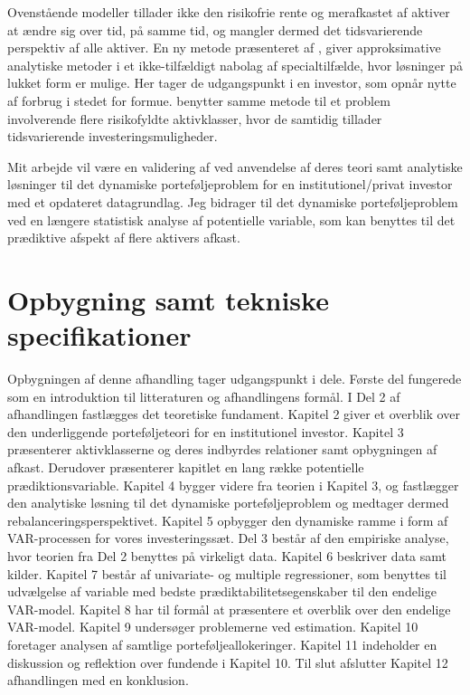 \documentclass[
  a4paper,
  oneside]{memoir}
\begin{document}
Ovenstående modeller tillader ikke den risikofrie rente og merafkastet af aktiver at ændre sig over tid, på samme tid, og mangler dermed det tidsvarierende perspektiv af alle aktiver. En ny metode præsenteret af \citep{CampVic1999, CampVic2001, CampVic2003}, giver approksimative analytiske metoder i et ikke-tilfældigt nabolag af specialtilfælde, hvor løsninger på lukket form er mulige. Her tager de udgangspunkt i en investor, som opnår nytte af forbrug i stedet for formue. \citep{CampVicCha2003} benytter samme metode til et problem involverende flere risikofyldte aktivklasser, hvor de samtidig tillader tidsvarierende investeringsmuligheder.

Mit arbejde vil være en validering af \citep{JurVic2011} ved anvendelse af deres teori samt analytiske løsninger til det dynamiske porteføljeproblem for en institutionel/privat investor med et opdateret datagrundlag. Jeg bidrager til det dynamiske porteføljeproblem ved en længere statistisk analyse af potentielle variable, som kan benyttes til det prædiktive afspekt af flere aktivers afkast.

\hypertarget{opbygning-samt-tekniske-specifikationer}{%
\section{Opbygning samt tekniske specifikationer}\label{opbygning-samt-tekniske-specifikationer}}

Opbygningen af denne afhandling tager udgangspunkt i dele. Første del fungerede som en introduktion til litteraturen og afhandlingens formål. I Del 2 af afhandlingen fastlægges det teoretiske fundament. Kapitel 2 giver et overblik over den underliggende porteføljeteori for en institutionel investor. Kapitel 3 præsenterer aktivklasserne og deres indbyrdes relationer samt opbygningen af afkast. Derudover præsenterer kapitlet en lang række potentielle prædiktionsvariable. Kapitel 4 bygger videre fra teorien i Kapitel 3, og fastlægger den analytiske løsning til det dynamiske porteføljeproblem og medtager dermed rebalanceringsperspektivet. Kapitel 5 opbygger den dynamiske ramme i form af VAR-processen for vores investeringssæt. Del 3 består af den empiriske analyse, hvor teorien fra Del 2 benyttes på virkeligt data. Kapitel 6 beskriver data samt kilder. Kapitel 7 består af univariate- og multiple regressioner, som benyttes til udvælgelse af variable med bedste prædiktabilitetsegenskaber til den endelige VAR-model. Kapitel 8 har til formål at præsentere et overblik over den endelige VAR-model. Kapitel 9 undersøger problemerne ved estimation. Kapitel 10 foretager analysen af samtlige porteføljeallokeringer. Kapitel 11 indeholder en diskussion og reflektion over fundende i Kapitel 10. Til slut afslutter Kapitel 12 afhandlingen med en konklusion.
\end{document}
